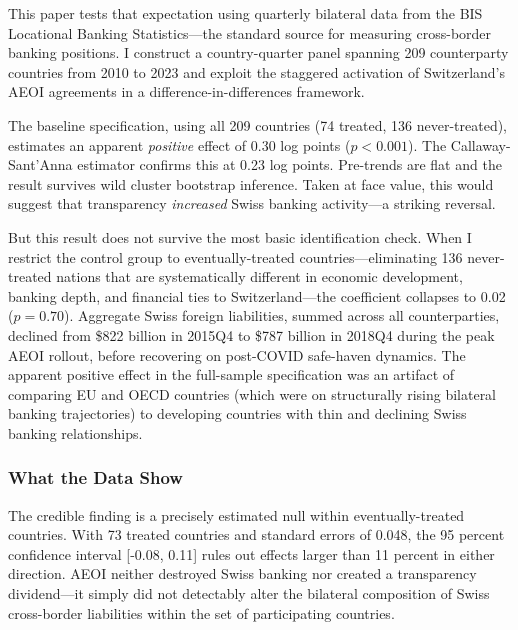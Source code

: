 \documentclass[12pt]{article}
\begin{document}
This paper tests that expectation using quarterly bilateral data from the BIS Locational Banking Statistics---the standard source for measuring cross-border banking positions. I construct a country-quarter panel spanning 209 counterparty countries from 2010 to 2023 and exploit the staggered activation of Switzerland's AEOI agreements in a difference-in-differences framework.

The baseline specification, using all 209 countries (74 treated, 136 never-treated), estimates an apparent \textit{positive} effect of 0.30 log points ($p < 0.001$). The Callaway-Sant'Anna estimator confirms this at 0.23 log points. Pre-trends are flat and the result survives wild cluster bootstrap inference. Taken at face value, this would suggest that transparency \textit{increased} Swiss banking activity---a striking reversal.

But this result does not survive the most basic identification check. When I restrict the control group to eventually-treated countries---eliminating 136 never-treated nations that are systematically different in economic development, banking depth, and financial ties to Switzerland---the coefficient collapses to 0.02 ($p = 0.70$). Aggregate Swiss foreign liabilities, summed across all counterparties, declined from \$822 billion in 2015Q4 to \$787 billion in 2018Q4 during the peak AEOI rollout, before recovering on post-COVID safe-haven dynamics. The apparent positive effect in the full-sample specification was an artifact of comparing EU and OECD countries (which were on structurally rising bilateral banking trajectories) to developing countries with thin and declining Swiss banking relationships.

\subsubsection*{What the Data Show} The credible finding is a precisely estimated null within eventually-treated countries. With 73 treated countries and standard errors of 0.048, the 95 percent confidence interval [-0.08, 0.11] rules out effects larger than 11 percent in either direction. AEOI neither destroyed Swiss banking nor created a transparency dividend---it simply did not detectably alter the bilateral composition of Swiss cross-border liabilities within the set of participating countries.
\end{document}
